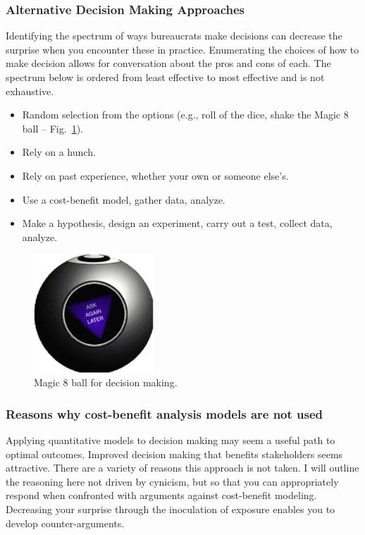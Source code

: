 \subsubsection{Alternative Decision Making Approaches}
Identifying the spectrum of ways bureaucrats make decisions can decrease the surprise when you encounter these in practice. Enumerating the choices of how to make decision allows for conversation about the pros and cons of each. The spectrum below is ordered from least effective to most effective and is not exhaustive.
\begin{itemize}
    \item Random selection from the options (e.g., roll of the dice, shake the Magic 8 ball -- Fig.~\ref{fig:magic8ball}).
    \item Rely on a hunch.
    \item Rely on past experience, whether your own or someone else's.
    \item Use a cost-benefit model, gather data, analyze.
    \item Make a hypothesis, design an experiment, carry out a test, collect data, analyze.
\end{itemize}

\begin{figure}
    \centering
    \includegraphics[width=0.4\textwidth]{images/magic8ball.pdf}
    \caption{Magic 8 ball for decision making.}
    \label{fig:magic8ball}
\end{figure}

\subsubsection{Reasons why cost-benefit analysis models are not used}

Applying quantitative models to decision making may seem a useful path to optimal outcomes. Improved decision making that benefits stakeholders seems attractive. There are a variety of reasons this approach is not taken. I will outline the reasoning here not driven by cynicism, but so that you can appropriately respond when confronted with arguments against cost-benefit modeling. Decreasing your surprise through the inoculation of exposure enables you to develop counter-arguments. 

